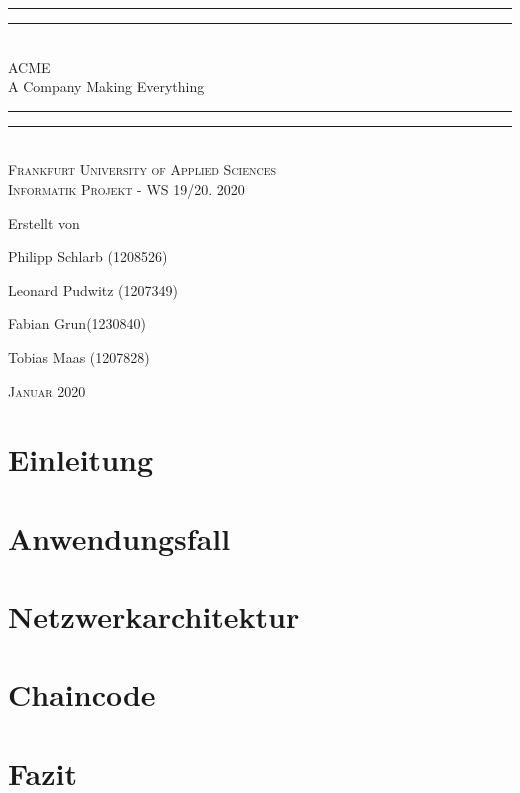 \documentclass[12pt]{report}
\newlength{\drop}
\begin{document}
\begin{titlepage}
    \textheight
    \centering
    \vspace*{\baselineskip}
    \rule{\textwidth}{1.6pt}\vspace*{-\baselineskip}\vspace*{2pt}
    \rule{\textwidth}{0.4pt}\\[\baselineskip]
    {\LARGE ACME \\ [0.3\baselineskip]A Company Making Everything}\\[0.2\baselineskip]
    \rule{\textwidth}{0.4pt}\vspace*{-\baselineskip}\vspace{3.2pt}
    \rule{\textwidth}{1.6pt}\\[\baselineskip]
    \scshape
    Frankfurt University of Applied Sciences \\Informatik Projekt - WS 19/20. 2020
    \date{4 February 2019} \par
    \vspace*{2\baselineskip}
    Erstellt von \\[\baselineskip]
    {\Large Philipp Schlarb (1208526) \par}
    {\Large Leonard Pudwitz (1207349) \par}
    {\Large Fabian Grun(1230840) \par}
    {\Large Tobias Maas (1207828) \par}
    \vfill
    
    \vfill{}
    {\scshape Januar 2020} \\
\end{titlepage}
\tableofcontents

\newpage

\chapter{Einleitung}
\label{1Einleitung}


\chapter{Anwendungsfall}
\label{2Anwendungsfall}


\chapter{Netzwerkarchitektur}
\label{3Netzwerkarchitektur}



\chapter{Chaincode} %
\label{3Chaincode}


\chapter{Fazit}
\label{4Fazit}




\end{document}
